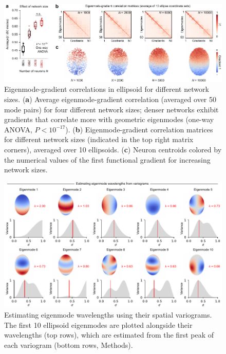\documentclass{article}
\begin{document}
\begin{figure}[t]
    \centering
    \includegraphics[width=1.0\linewidth]{figures/supp_network_size.pdf}
    \caption{Eigenmode-gradient correlations in ellipsoid for different network sizes. (\textbf{a}) Average eigenmode-gradient correlation (averaged over 50 mode pairs) for four different network sizes; denser networks exhibit gradients that correlate more with geometric eigenmodes (one-way ANOVA, $P<10^{-17}$). (\textbf{b}) Eigenmode-gradient correlation matrices for different network sizes (indicated in the top right matrix corners), averaged over 10 ellipsoids. (\textbf{c}) Neuron centroids colored by the numerical values of the first functional gradient for increasing network sizes.}
    \label{supp_network_size}
\end{figure}

\newpage

\begin{figure}[t]
    \centering
    \includegraphics[width=1.0\linewidth]{figures/supp_variograms.pdf}
    \caption{Estimating eigenmode wavelengths using their spatial variograms. The first 10 ellipsoid eigenmodes are plotted alongside their wavelengths (top rows), which are estimated from the first peak of each variogram (bottom rows, Methods).}
    \label{supp_variograms}
\end{figure}
\end{document}
